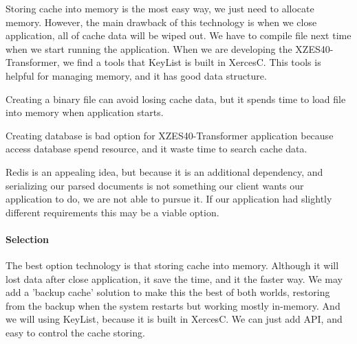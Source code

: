 Storing cache into memory is the most easy way, we just need to allocate memory.
However, the main drawback of this technology is when we close application, all of cache data will be wiped out.
We have to compile file next time when we start running the application.
When we are developing the XZES40-Transformer, we find a tools that KeyList is built in XercesC.
This tools is helpful for managing memory, and it has good data structure.

Creating a binary file can avoid losing cache data, but it spends time to load file into memory when application starts.

Creating database is bad option for XZES40-Transformer application because access database spend resource, and it waste time to search cache data.

Redis is an appealing idea, but because it is an additional dependency, and serializing our parsed documents is not something our client wants our application to do, we are not able to pursue it.
If our application had slightly different requirements this may be a viable option.

\paragraph{Selection}

The best option technology is that storing cache into memory.
Although it will lost data after close application, it save the time, and it the faster way.
We may add a 'backup cache' solution to make this the best of both worlds, restoring from the backup when the system restarts but working mostly in-memory.
And we will using KeyList, because it is built in XercesC.
We can just add API, and easy to control the cache storing.
